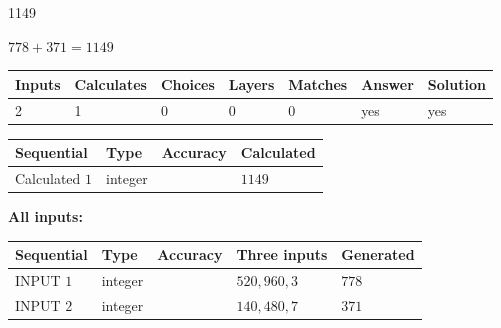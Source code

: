 \documentclass{ctexart}
\begin{document}
 
 
\noindent{}
 
 

1149
 
 
\noindent{}
 
 

 
 
 
\noindent{}
 
 

$ %
778 +  %
371=   %
1149$
 
 
\noindent{}
 
 

 
   
   
   
   
\noindent\begin{tabular}{|l|l|l|l|l|l|l|}
 \hline
Inputs & Calculates & Choices & Layers & Matches & Answer & Solution \\ \hline
 2  & 
 1  & 
 0
  & 
 0  & 
 0  & 
  yes & 
  yes 
  \\ \hline
 \end{tabular}
   
   
   
   
\noindent{}
   
   
  
  
\noindent\begin{tabular}{|l|l|l|l|}
\hline
 Sequential & Type & Accuracy & Calculated \\ 
\hline
 
 
  Calculated $  1 $ & integer &  & 
  $ 1149 $ 
 \\  \hline  
 \end{tabular}
   
   
   
   
\noindent\vspace{0.1in}\hspace{-0.08in} {\textbf{\Large{All inputs: }}}
   
   
  
  
\noindent\begin{tabular}{|l|l|l|l|l|}
\hline
 Sequential & Type & Accuracy & Three inputs & Generated \\ 
\hline
 
 
  INPUT $  1 $ & integer &  & $
 520
 , 
 960
 , 
 3
 $ & $ 778 $ 
 \\  \hline  
 
 
  INPUT $  2 $ & integer &  & $
 140
 , 
 480
 , 
 7
 $ & $ 371 $ 
 \\  \hline  
 \end{tabular}
   
\end{document}
